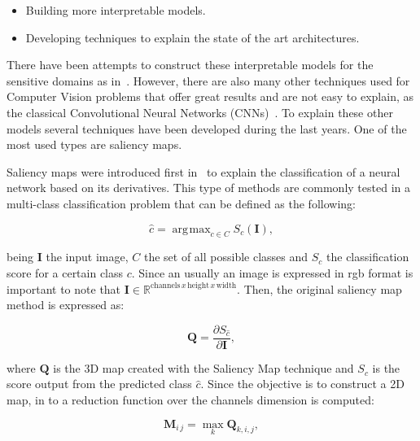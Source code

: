 \documentclass[preprint,12pt]{elsarticle}
\DeclareMathOperator*{\argmax}{arg\!max}
\begin{document}
\begin{itemize}
    \item Building more interpretable models.
    \item Developing techniques to explain the state of the art architectures.
\end{itemize}

There have been attempts to construct these interpretable models for the sensitive domains as in~\cite{Singh2022}. However, there are also many other techniques used for Computer Vision problems that offer great results and are not easy to explain, as the classical Convolutional Neural Networks (CNNs)~\cite{LeCun1998}. To explain these other models  several techniques have been developed during the last years. One of the most used types are saliency maps.

Saliency maps were introduced first in~\cite{Simonyan2014} to explain the classification of a neural network based on its derivatives. This type of methods are commonly tested in a multi-class classification problem that can be defined as the following:

\begin{equation}
    \label{eq: cnn output}
    \hat{c} = \argmax_{c \in C}S_c(\boldsymbol{I}),
\end{equation}

\noindent
being $\boldsymbol{I}$ the input image, $C$ the set of all possible classes and $S_c$ the classification score for a certain class $c$. Since an usually an image is expressed in rgb format is important to note that $\boldsymbol{I} \in \mathbb{R}^{\text{channels}\, x\, \text{height}\, x\, \text{width}}$. Then, the original saliency map method is expressed as:

\begin{equation}
    \label{eq: 3d saliency map}
    \boldsymbol{Q} = \frac{\partial S_{\hat{c}}}{\partial \boldsymbol{I}},
\end{equation}

\noindent
where $\boldsymbol{Q}$ is the 3D map created with the Saliency Map technique and $S_{\hat{c}}$ is the score output from the predicted class $\hat{c}$. Since the objective is to construct a 2D map, in \cite{Simonyan2014} to a reduction function over the channels dimension is computed:

\begin{equation}
    \label{eq: 3d saliency map}
    \boldsymbol{M}_{i\, j} = \max_{k} \boldsymbol{Q}_{k, i, j},
\end{equation}
\end{document}
